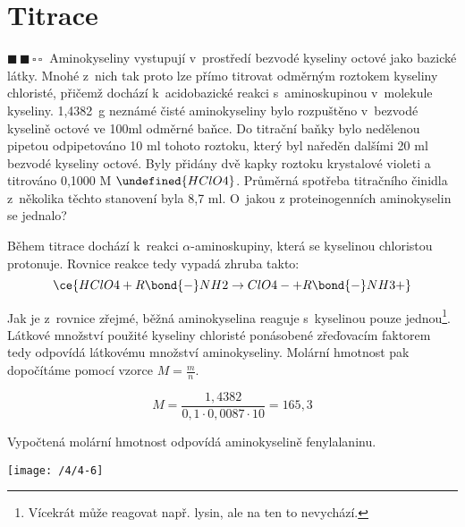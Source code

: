\documentclass{book}
\let\ch\undefined
\newcommand{\dva}{$\blacksquare \, \blacksquare \, \square \, \square \; \; $}
\renewenvironment{quotation}{\par}{\par} %
\begin{document}
\section{Titrace}

\begin{quotation}
\dva Aminokyseliny vystupují v~prostředí bezvodé kyseliny octové jako bazické
látky. Mnohé z~nich tak proto lze přímo titrovat odměrným roztokem
kyseliny chloristé, přičemž dochází k~acidobazické reakci s~aminoskupinou
v~molekule kyseliny. 1,4382~g neznámé čisté aminokyseliny bylo rozpuštěno
v~bezvodé kyselině octové ve 100ml odměrné baňce. Do titrační baňky
bylo nedělenou pipetou odpipetováno 10 ml tohoto roztoku, který byl
naředěn dalšími 20 ml bezvodé kyseliny octové. Byly přidány dvě kapky
roztoku krystalové violeti a titrováno 0,1000 M $\ch{HClO4}$. Průměrná spotřeba
titračního činidla z~několika těchto stanovení byla 8,7 ml. O~jakou
z proteinogenních aminokyselin se jednalo?
\end{quotation} \dotfill \par 
Během titrace dochází k~reakci $\alpha$-aminoskupiny, která se kyselinou
chloristou protonuje. Rovnice reakce tedy vypadá zhruba takto:
\[
\ce{HClO4 +R\bond{-}NH2\rightarrow ClO4- +R\bond{-}NH3+}
\]

Jak je z~rovnice zřejmé, běžná aminokyselina reaguje s~kyselinou pouze
jednou\footnote{Vícekrát může reagovat např. lysin, ale na ten to nevychází.}.
Látkové množství použité kyseliny chloristé ponásobené zřeďovacím
faktorem tedy odpovídá látkovému množství aminokyseliny. Molární hmotnost
pak dopočítáme pomocí vzorce $M=\frac{m}{n}$.

\[
M=\frac{1,4382}{0,1\cdot0,0087\cdot10}=165,3
\]

Vypočtená molární hmotnost odpovídá aminokyselině fenylalaninu.
\noindent \begin{center}

\texttt{[image: /4/4-6]}

\par\end{center}
\end{document}
